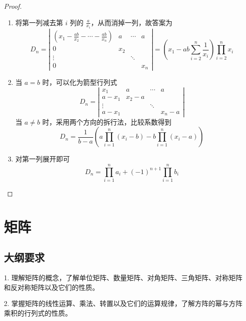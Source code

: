 \begin{proof}
	\begin{enumerate}
		\item 将第一列减去第 $i$ 列的 $\frac{a}{x_i}$，从而消掉一列，故答案为
		      \[ D_n = \left|\begin{matrix}
				      (x_1 - \frac{ab}{x_2} - \cdots - \frac{ab}{x_n}) & a   & \cdots & a   \\
				      0                                                & x_2 &              \\
				      \vdots                                           &     & \ddots       \\
				      0                                                &     &        & x_n
			      \end{matrix}\right| = \left(x_1 - ab\sum_{i=2}^{n} \frac{1}{x_i}\right) \prod_{i=2}^n x_i  \]
		\item 当 $a=b$ 时，可以化为箭型行列式
		      \[ D_n = \left|\begin{matrix}
				      x_1    & a       & \cdots & a       \\
				      a-x_1  & x_2 - a &                  \\
				      \vdots &         & \ddots           \\
				      a-x_1  &         &        & x_n - a
			      \end{matrix}\right| \]
		      当 $a \neq b$ 时，采用两个方向的拆行法，比较系数得到
		      \[ D_n = \frac{1}{b - a}\left(a \prod_{i=1}^n (x_i-b) - b\prod_{i = 1}^n (x_i - a)\right) \]
		\item 对第一列展开即可
		      \[ D_n = \prod_{i=1}^n a_i + (-1)^{n+1} \prod_{i=1}^n b_i \]
	\end{enumerate}
\end{proof}



\section{矩阵}

\subsection{大纲要求}

1. 理解矩阵的概念，了解单位矩阵、数量矩阵、对角矩阵、三角矩阵、对称矩阵和反对称矩阵以及它们的性质。

2. 掌握矩阵的线性运算、乘法、转置以及它们的运算规律，了解方阵的幂与方阵乘积的行列式的性质。


